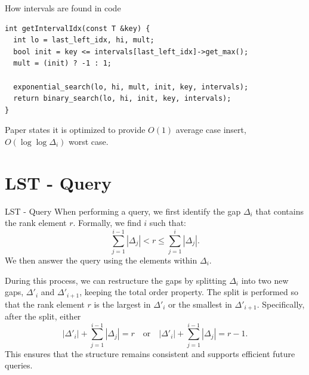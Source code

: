 \documentclass[aspectratio=169,xcolor=dvipsnames]{beamer}
\begin{document}

\begin{frame}[fragile]{How intervals are found in code}
\begin{verbatim}
int getIntervalIdx(const T &key) {
  int lo = last_left_idx, hi, mult;
  bool init = key <= intervals[last_left_idx]->get_max();
  mult = (init) ? -1 : 1;

  exponential_search(lo, hi, mult, init, key, intervals);
  return binary_search(lo, hi, init, key, intervals);
}
\end{verbatim}

Paper states it is optimized to provide $O(1)$ average case insert, $O(\log\log \Delta_i)$ worst case.
\end{frame}


\section{LST - Query}
\begin{frame}{LST - Query}
    When performing a query, we first identify the gap $\Delta_i$ that contains the rank element $r$. Formally, we find $i$ such that:
    \[
    \sum_{j=1}^{i-1} |\Delta_j| < r \leq \sum_{j=1}^{i} |\Delta_j|.
    \]
    We then answer the query using the elements within $\Delta_i$.

    During this process, we can restructure the gaps by splitting $\Delta_i$ into two new gaps, $\Delta'_i$ and $\Delta'_{i+1}$, keeping the total order property. The split is performed so that the rank element $r$ is the largest in $\Delta'_i$ or the smallest in $\Delta'_{i+1}$. Specifically, after the split, either
    \[
    |\Delta'_i| + \sum_{j=1}^{i-1} |\Delta_j| = r \quad \text{or} \quad  |\Delta'_i| + \sum_{j=1}^{i-1} |\Delta_j| = r - 1.
    \]
    This ensures that the structure remains consistent and supports efficient future queries.
\end{frame}

\end{document}
